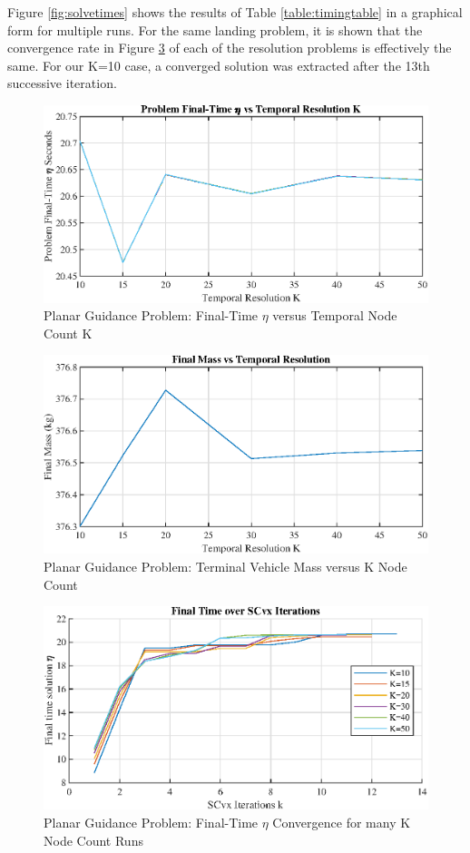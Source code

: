 Figure \ref{fig:solvetimes} shows the results of Table \ref{table:timingtable} in a graphical form for multiple runs. For the same landing problem, it is shown that the convergence rate in Figure \ref{fig:iterations} of each of the resolution problems is effectively the same. For our K=10 case, a converged solution was extracted after the 13th successive iteration.
\begin{figure}[!htbp] 
\label{}
  \centering
  \includegraphics[width=\textwidth]{figs/etavsK.eps}
  \caption{Planar Guidance Problem: Final-Time $\eta$ versus Temporal Node Count K}
  \label{fig:finaltimeplot}
\end{figure}
\begin{figure}[!htbp] 
\label{}
  \centering
  \includegraphics[width=\textwidth]{figs/massvsK.eps}
  \caption{Planar Guidance Problem: Terminal Vehicle Mass versus K Node Count}
  \label{fig:massdisperse}
\end{figure}
\begin{figure}[!htbp] 
\label{}
  \centering
  \includegraphics[width=\textwidth]{figs/iteratetiming.eps}
  \caption{Planar Guidance Problem: Final-Time $\eta$ Convergence for many K Node Count Runs}
  \label{fig:iterations}
\end{figure}

